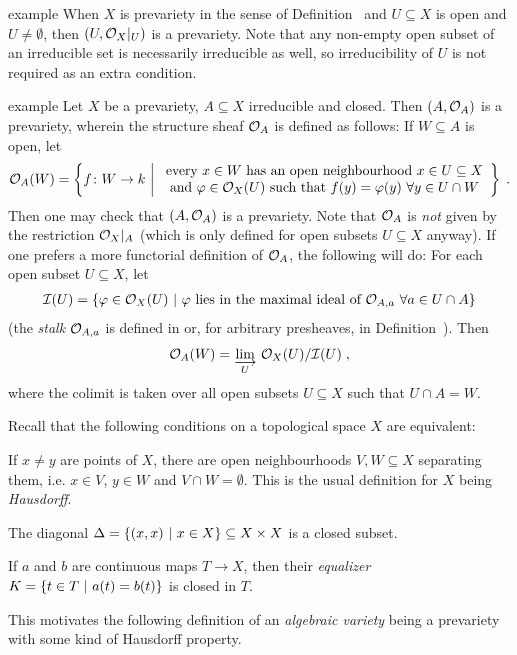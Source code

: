 \documentclass[a4paper,parskip=half,numbers=enddot, DIV=12]{scrreprt}
\begin{document}
\begin{varthm}{example}
 When $X$ is prevariety in the sense of Definition~ and $U\subseteq X$ is open and $U\neq \emptyset$, then $(U,\mathcal{O}_X|_U)$ is a prevariety. Note that any non-empty open subset of an irreducible set is necessarily irreducible as well, so irreducibility of $U$ is not required as an extra condition.
\end{varthm}
\begin{varthm}[b]{example}
 Let $X$ be a prevariety, $A\subseteq X$ irreducible and closed. Then $(A,\mathcal{O}_A)$ is a prevariety, wherein the structure sheaf $\mathcal{O}_A$ is defined as follows: If $W\subseteq A$ is open, let
 \begin{align*}
    \Oo_A(W) = \left\{ f\colon W\to k \st 
    \begin{array}{c}
	    \text{every } x\in W\text{ has an open neighbourhood } x\in U\subseteq X  \\
	    \text{and } \phi\in \Oo_X(U)\text{ such that } f(y) = \phi(y)\ \forall y\in U\cap W
    \end{array}\right\}\;.
 \end{align*}
 Then one may check that $(A,\mathcal{O}_A)$ is a prevariety. Note that $\mathcal{O}_A$ is \emph{not} given by the restriction $\mathcal{O}_X|_A$ (which is only defined for open subsets $U\subseteq X$ anyway). If one prefers a more functorial definition of $\mathcal{O}_A$, the following will do: For each open subset $U\subseteq X$, let 
 \begin{align*}
 	\mathcal{I}(U)=\left\{\varphi\in\mathcal{O}_X(U)\ \middle|\  \varphi\text{ lies in the maximal ideal of }\mathcal{O}_{A,a}\ \forall a\in U\cap A\right\}
 \end{align*}
 (the \emph{stalk} $\mathcal{O}_{A,a}$ is defined in \cite[Definition 2.2.5]{alg1} or, for arbitrary presheaves, in Definition~). Then
 \begin{align*}
 	\Oo_A(W)=\colimit[U] \Oo_X(U)/\Ii(U)\;,
 \end{align*}
	where the colimit is taken over all open subsets $U\subseteq X$ such that $U\cap A=W$.
\end{varthm}

\begin{rem*}
 Recall that the following conditions on a topological space $X$ are equivalent:
 \begin{alphanumerate}
  \item
    If $x\neq y$ are points of $X$, there are open neighbourhoods $V,W\subseteq X$ separating them, i.e. $x\in V$, $y\in W$ and $V\cap W= \emptyset$. This is the usual definition for $X$ being \emph{Hausdorff}.
  \item
    The diagonal $\Delta = \left\{(x,x)\ \middle|\  x\in X\right\}\subseteq X\times X$ is a closed subset.
  \item 
    If $a$ and $b$ are continuous maps $T\to X$, then their \emph{equalizer} $K = \left\{t\in T\ \middle|\  a(t) = b(t)\right\}$ is closed in $T$.
 \end{alphanumerate}
This motivates the following definition of an \emph{algebraic variety} being a prevariety with some kind of Hausdorff property.
\end{rem*}
\end{document}

